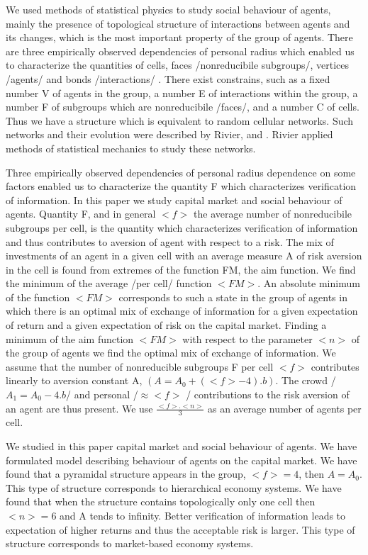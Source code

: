 \documentclass[10pt]{article}
\begin{document}
We used \cite{5}
methods of statistical physics to study  social behaviour of agents,
mainly the presence of topological structure of interactions between
agents and its changes, which is the most important property of
the group of agents. There are three empirically observed dependencies of personal radius which enabled us
to characterize the quantities of cells,
faces /nonreducibile subgroups/, vertices /agents/ and bonds /interactions/ \cite{2}.
There exist constrains, such as a fixed number V of agents in
the group,  a number E of interactions within the group, a number F
of subgroups which are nonreducibile /faces/, and a number C of cells. Thus
we have a structure which is equivalent to random cellular networks.
Such networks and their evolution were described by Rivier,
\cite{3} and \cite{4}. Rivier applied methods
of statistical mechanics to study these networks.


Three empirically observed  dependencies of personal radius dependence on some factors
enabled us \cite{5} to characterize the quantity F which characterizes verification of information.
In this paper we study capital market and social behaviour of agents. Quantity F, and in general $<f>$ the average number of nonreducibile subgroups per cell, is the
quantity which characterizes verification of information and thus contributes to aversion of agent with respect to a risk.
The mix of investments of an agent in a given cell with an average measure A of risk aversion in the cell is found from
extremes of the function FM, the aim function. We find the minimum of the average  /per cell/ function $<FM>$. An absolute minimum of the function $<FM>$ corresponds to such a state 
in the group of agents in which there is an optimal mix of exchange of information for a given expectation of return and a given expectation of risk on the capital market.
Finding a minimum of the aim function $<FM>$ with respect to the parameter $ <n> $ of the group of agents we find the optimal mix of exchange of information. We assume that the number of nonreducible subgroups F per cell $<f>$ contributes linearly to aversion constant A, $ (A = A_{0} + (<f> - 4).b)$. The crowd /$A_{1} = A_{0} - 4.b $/ and personal /$\approx <f>$ / contributions to the risk aversion of an agent are thus present. We use $\frac{<f>.<n>}{3}$ as an average number of agents per cell.


We studied in this paper capital market and social behaviour of agents. We have formulated model describing behaviour of agents on the capital market.
We have found that a pyramidal structure appears in the group, $<f> = 4$, then $A = A_{0} $.
This type of structure  corresponds to hierarchical economy systems.
We have found that when the structure
contains topologically only one cell then $<n> = 6$ and A tends to infinity. Better verification of information leads to expectation of higher returns and thus the acceptable risk is larger.
This type of structure  corresponds to market-based economy systems.
\end{document}
